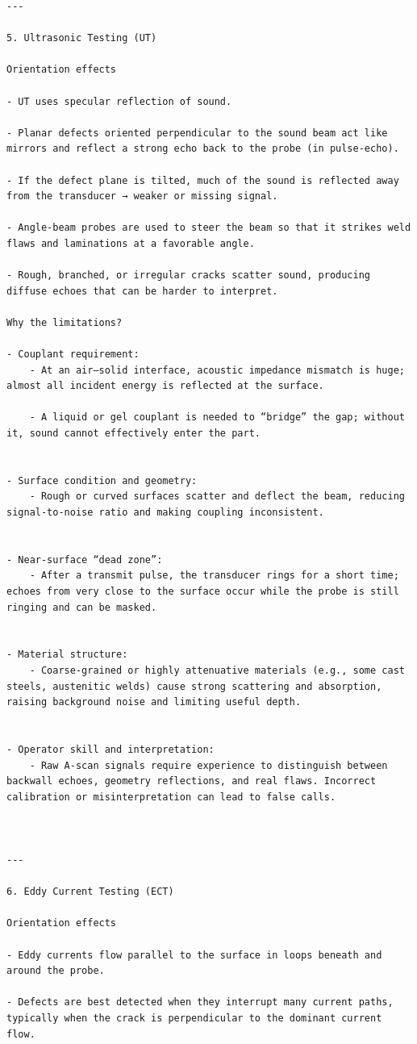 \documentclass[11pt]{article}
\begin{document}
\begin{verbatim}
---

5. Ultrasonic Testing (UT)

Orientation effects

- UT uses specular reflection of sound.

- Planar defects oriented perpendicular to the sound beam act like mirrors and reflect a strong echo back to the probe (in pulse‑echo).

- If the defect plane is tilted, much of the sound is reflected away from the transducer → weaker or missing signal.

- Angle-beam probes are used to steer the beam so that it strikes weld flaws and laminations at a favorable angle.

- Rough, branched, or irregular cracks scatter sound, producing diffuse echoes that can be harder to interpret.

Why the limitations?

- Couplant requirement:
	- At an air–solid interface, acoustic impedance mismatch is huge; almost all incident energy is reflected at the surface.

	- A liquid or gel couplant is needed to “bridge” the gap; without it, sound cannot effectively enter the part.


- Surface condition and geometry:
	- Rough or curved surfaces scatter and deflect the beam, reducing signal-to-noise ratio and making coupling inconsistent.


- Near-surface “dead zone”:
	- After a transmit pulse, the transducer rings for a short time; echoes from very close to the surface occur while the probe is still ringing and can be masked.


- Material structure:
	- Coarse-grained or highly attenuative materials (e.g., some cast steels, austenitic welds) cause strong scattering and absorption, raising background noise and limiting useful depth.


- Operator skill and interpretation:
	- Raw A‑scan signals require experience to distinguish between backwall echoes, geometry reflections, and real flaws. Incorrect calibration or misinterpretation can lead to false calls.



---

6. Eddy Current Testing (ECT)

Orientation effects

- Eddy currents flow parallel to the surface in loops beneath and around the probe.

- Defects are best detected when they interrupt many current paths, typically when the crack is perpendicular to the dominant current flow.


\end{verbatim}
\end{document}
